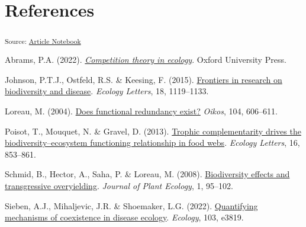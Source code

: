 \documentclass[
  letterpaper,
  DIV=11,
  numbers=noendperiod]{scrartcl}
\newlength{\cslhangindent}
\newenvironment{CSLReferences}[2] %
 {\begin{list}{}{%
  \setlength{\itemindent}{0pt}
  \setlength{\leftmargin}{0pt}
  \setlength{\parsep}{0pt}
  \ifodd #1
   \setlength{\leftmargin}{\cslhangindent}
   \setlength{\itemindent}{-1\cslhangindent}
  \fi
  \setlength{\itemsep}{#2\baselineskip}}}
 {\end{list}}
\begin{document}
\section{References}

\textsubscript{Source:
\href{https://colebrookson.github.io/disease-overyield/index.qmd.html}{Article
Notebook}}

\label{refs}
\begin{CSLReferences}{1}{0}
Abrams, P.A. (2022).
\emph{\href{https://books.google.ca/books?hl=en&lr=&id=fTaFEAAAQBAJ&oi=fnd&pg=PP1&dq=abrams+2022+competition+theory&ots=_cdJwLVcq_&sig=ZUB2hKd4WD_YZsynGVHu114pnJ4}{Competition
theory in ecology}}. Oxford University Press.

Johnson, P.T.J., Ostfeld, R.S. \& Keesing, F. (2015).
\href{https://doi.org/10.1111/ele.12479}{Frontiers in research on
biodiversity and disease}. \emph{Ecology Letters}, 18, 1119--1133.

Loreau, M. (2004).
\href{https://doi.org/10.1111/j.0030-1299.2004.12685.x}{Does functional
redundancy exist?} \emph{Oikos}, 104, 606--611.

Poisot, T., Mouquet, N. \& Gravel, D. (2013).
\href{https://doi.org/10.1111/ele.12118}{Trophic complementarity drives
the biodiversity--ecosystem functioning relationship in food webs}.
\emph{Ecology Letters}, 16, 853--861.

Schmid, B., Hector, A., Saha, P. \& Loreau, M. (2008).
\href{https://academic.oup.com/jpe/article-abstract/1/2/95/989985}{Biodiversity
effects and transgressive overyielding}. \emph{Journal of Plant
Ecology}, 1, 95--102.

Sieben, A.J., Mihaljevic, J.R. \& Shoemaker, L.G. (2022).
\href{https://doi.org/10.1002/ecy.3819}{Quantifying mechanisms of
coexistence in disease ecology}. \emph{Ecology}, 103, e3819.

\end{CSLReferences}
\end{document}
